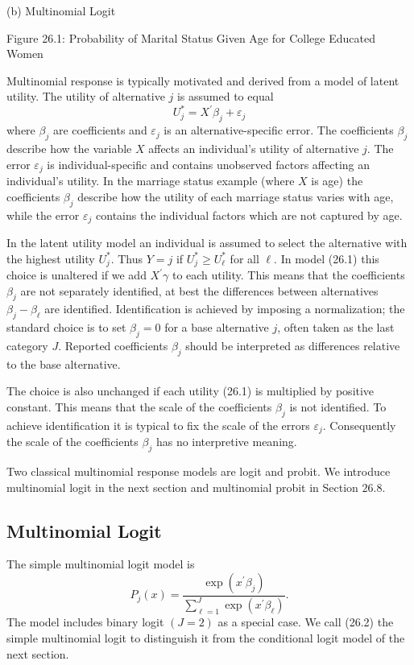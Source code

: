 \documentclass[10pt]{article}
\begin{document}
(b) Multinomial Logit

Figure 26.1: Probability of Marital Status Given Age for College Educated Women

Multinomial response is typically motivated and derived from a model of latent utility. The utility of alternative $j$ is assumed to equal
$$
U_{j}^{*}=X^{\prime} \beta_{j}+\varepsilon_{j}
$$
where $\beta_{j}$ are coefficients and $\varepsilon_{j}$ is an alternative-specific error. The coefficients $\beta_{j}$ describe how the variable $X$ affects an individual's utility of alternative $j$. The error $\varepsilon_{j}$ is individual-specific and contains unobserved factors affecting an individual's utility. In the marriage status example (where $X$ is age) the coefficients $\beta_{j}$ describe how the utility of each marriage status varies with age, while the error $\varepsilon_{j}$ contains the individual factors which are not captured by age.

In the latent utility model an individual is assumed to select the alternative with the highest utility $U_{j}^{*}$. Thus $Y=j$ if $U_{j}^{*} \geq U_{\ell}^{*}$ for all $\ell$. In model (26.1) this choice is unaltered if we add $X^{\prime} \gamma$ to each utility. This means that the coefficients $\beta_{j}$ are not separately identified, at best the differences between alternatives $\beta_{j}-\beta_{\ell}$ are identified. Identification is achieved by imposing a normalization; the standard choice is to set $\beta_{j}=0$ for a base alternative $j$, often taken as the last category $J$. Reported coefficients $\beta_{j}$ should be interpreted as differences relative to the base alternative.

The choice is also unchanged if each utility (26.1) is multiplied by positive constant. This means that the scale of the coefficients $\beta_{j}$ is not identified. To achieve identification it is typical to fix the scale of the errors $\varepsilon_{j}$. Consequently the scale of the coefficients $\beta_{j}$ has no interpretive meaning.

Two classical multinomial response models are logit and probit. We introduce multinomial logit in the next section and multinomial probit in Section $26.8$.

\subsection{Multinomial Logit}
The simple multinomial logit model is
$$
P_{j}(x)=\frac{\exp \left(x^{\prime} \beta_{j}\right)}{\sum_{\ell=1}^{J} \exp \left(x^{\prime} \beta_{\ell}\right)} .
$$
The model includes binary logit $(J=2)$ as a special case. We call (26.2) the simple multinomial logit to distinguish it from the conditional logit model of the next section.
\end{document}
